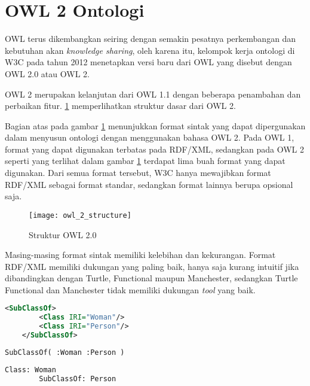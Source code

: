 \section{OWL 2 Ontologi}
OWL terus dikembangkan seiring dengan semakin pesatnya perkembangan dan kebutuhan akan \emph{knowledge sharing}, oleh karena itu, kelompok kerja ontologi di W3C pada tahun 2012 menetapkan versi baru dari OWL yang disebut dengan OWL 2.0 atau OWL 2.

OWL 2 merupakan kelanjutan dari OWL 1.1 dengan beberapa penambahan dan perbaikan fitur. \ref{fig:owl_2_structure} memperlihatkan struktur dasar dari OWL 2.

Bagian atas pada gambar \ref{fig:owl_2_structure} menunjukkan format sintak yang dapat dipergunakan dalam menyusun ontologi dengan menggunakan bahasa OWL 2. Pada OWL 1, format yang dapat digunakan terbatas pada RDF/XML, sedangkan pada OWL 2 seperti yang terlihat dalam gambar \ref{fig:owl_2_structure} terdapat lima buah format yang dapat digunakan. Dari semua format tersebut, W3C hanya mewajibkan format RDF/XML sebagai format standar, sedangkan format lainnya berupa opsional saja.

\begin{figure}[ht]
	\centering
	\texttt{[image: owl\_2\_structure]}
	\caption{Struktur OWL 2.0}
	\label{fig:owl_2_structure}
\end{figure}

Masing-masing format sintak memiliki kelebihan dan kekurangan. Format RDF/XML memiliki dukungan yang paling baik, hanya saja kurang intuitif jika dibandingkan dengan Turtle, Functional maupun Manchester, sedangkan Turtle Functional dan Manchester tidak memiliki dukungan \emph{tool} yang baik.

\begin{lstlisting}[language=XML, caption=contoh sintak RDF/XML, xleftmargin=0pt]
	<SubClassOf>
		<Class IRI="Woman"/>
		<Class IRI="Person"/>
	</SubClassOf>
\end{lstlisting}

\begin{lstlisting}[language=XML, caption=contoh sintak functional, xleftmargin=0pt]
	SubClassOf( :Woman :Person )
\end{lstlisting}
	
\begin{lstlisting}[language=XML, caption=contoh manchester syntax, xleftmargin=0pt]
	Class: Woman
		SubClassOf: Person
\end{lstlisting}

